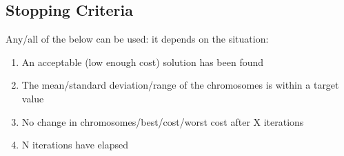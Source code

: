 \subsection{Stopping Criteria}
Any/all of the below can be used: it depends on the situation:
\begin{enumerate}
    \item An acceptable (low enough cost) solution has been found
    \item The mean/standard deviation/range of the chromosomes is within a target value
    \item No change in chromosomes/best/cost/worst cost after X iterations
    \item N iterations have elapsed
\end{enumerate}